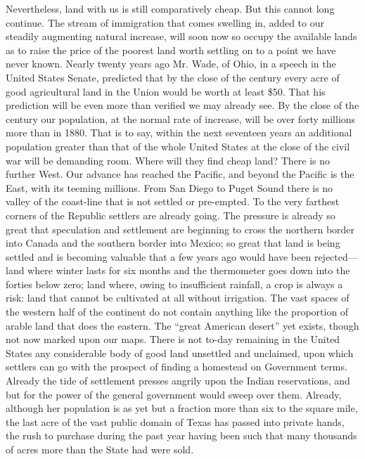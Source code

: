 \documentclass{book}
\begin{document}
Nevertheless, land with us is still comparatively cheap. But this cannot long continue. The stream of immigration that comes swelling in, added to our steadily augmenting natural increase, will soon now so occupy the available lands as to raise the price of the poorest land worth settling on to a point we have never known. Nearly twenty years ago Mr. Wade, of Ohio, in a speech in the United States Senate, predicted that by the close of the century every acre of good agricultural land in the Union would be worth at least \$50. That his prediction will be even more than verified we may already see. By the close of the century our population, at the normal rate of increase, will be over forty millions more than in 1880. That is to say, within the next seventeen years an additional population greater than that of the whole United States at the close of the civil war will be demanding room. Where will they find cheap land? There is no further West. Our advance has reached the Pacific, and beyond the Pacific is the East, with its teeming millions. From San Diego to Puget Sound there is no valley of the coast-line that is not settled or pre-empted. To the very farthest corners of the Republic settlers are already going. The pressure is already so great that speculation and settlement are beginning to cross the northern border into Canada and the southern border into Mexico; so great that land is being settled and is becoming valuable that a few years ago would have been rejected—land where winter lasts for six months and the thermometer goes down into the forties below zero; land where, owing to insufficient rainfall, a crop is always a risk: land that cannot be cultivated at all without irrigation. The vast spaces of the western half of the continent do not contain anything like the proportion of arable land that does the eastern. The “great American desert” yet exists, though not now marked upon our maps. There is not to-day remaining in the United States any considerable body of good land unsettled and unclaimed, upon which settlers can go with the prospect of finding a homestead on Government terms. Already the tide of settlement presses angrily upon the Indian reservations, and but for the power of the general government would sweep over them. Already, although her population is as yet but a fraction more than six to the square mile, the last acre of the vast public domain of Texas has passed into private hands, the rush to purchase during the past year having been such that many thousands of acres more than the State had were sold.
\end{document}
